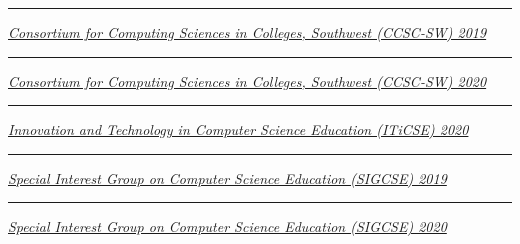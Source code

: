 \documentclass[margin,line]{res}
\begin{document}
\begin{resume}
\rule{-1mm}{5mm} \hspace*{4mm} \href{http://www.ccsc.org/southwestern/2019/index.php}{\textit{Consortium for Computing Sciences in Colleges, Southwest (CCSC-SW) 2019}}\\
\rule{-1mm}{5mm} \hspace*{4mm} \href{http://www.ccsc.org/southwestern/2020/index.php}{\textit{Consortium for Computing Sciences in Colleges, Southwest (CCSC-SW) 2020}}\\
\rule{-1mm}{5mm} \hspace*{4mm} \href{https://iticse.acm.org/}{\textit{Innovation and Technology in Computer Science Education (ITiCSE) 2020}}\\
\rule{-1mm}{5mm} \hspace*{4mm} \href{https://sigcse2019.sigcse.org/}{\textit{Special Interest Group on Computer Science Education (SIGCSE) 2019}}\\
\rule{-1mm}{5mm} \hspace*{4mm} \href{https://sigcse2020.sigcse.org/}{\textit{Special Interest Group on Computer Science Education (SIGCSE) 2020}}\\


\end{resume}
\end{document}
